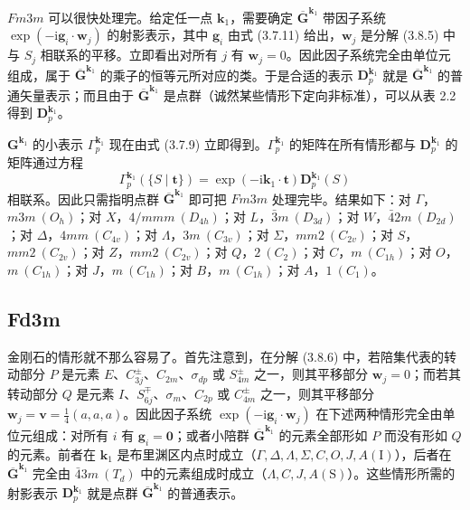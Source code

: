 $Fm3m$ 可以很快处理完。给定任一点 $\mathbf{k}_{1}$，需要确定 $\overline{\mathbf{G}}^{\mathbf{k}_{1}}$ 带因子系统 $\exp(-\mathrm{i}\mathbf{g}_{i} \cdot \mathbf{w}_{j})$ 的射影表示，其中 $\mathbf{g}_{i}$ 由式 (3.7.11) 给出，$\mathbf{w}_{j}$ 是分解 (3.8.5) 中与 $S_{j}$ 相联系的平移。立即看出对所有 $j$ 有 $\mathbf{w}_{j} = 0$。因此因子系统完全由单位元组成，属于 $\overline{\mathbf{G}}^{\mathbf{k}_{1}}$ 的乘子的恒等元所对应的类。于是合适的表示 $\mathbf{D}^{\mathbf{k}_{1}}_{p}$ 就是 $\overline{\mathbf{G}}^{\mathbf{k}_{1}}$ 的普通矢量表示；而且由于 $\overline{\mathbf{G}}^{\mathbf{k}_{1}}$ 是点群（诚然某些情形下定向非标准），可以从表 2.2 得到 $\mathbf{D}^{\mathbf{k}_{1}}_{p}$。

$\mathbf{G}^{\mathbf{k}_{1}}$ 的小表示 $\Gamma^{\mathbf{k}_{1}}_{p}$ 现在由式 (3.7.9) 立即得到。$\Gamma^{\mathbf{k}_{1}}_{p}$ 的矩阵在所有情形都与 $\mathbf{D}^{\mathbf{k}_{1}}_{p}$ 的矩阵通过方程
\begin{equation*}
\Gamma^{\mathbf{k}_{1}}_{p}(\{S \mid \mathbf{t}\}) = \exp(-\mathrm{i}\mathbf{k}_{1} \cdot \mathbf{t})\mathbf{D}^{\mathbf{k}_{1}}_{p}(S)
\tag{3.8.7}
\end{equation*}
相联系。因此只需指明点群 $\overline{\mathbf{G}}^{\mathbf{k}_{1}}$ 即可把 $Fm3m$ 处理完毕。结果如下：对 $\Gamma$，$m3m\ (O_{h})$；对 $X$，$4/mmm\ (D_{4h})$；对 $L$，$\bar{3}m\ (D_{3d})$；对 $W$，$\bar{4}2m\ (D_{2d})$；对 $\Delta$，$4mm\ (C_{4v})$；对 $\Lambda$，$3m\ (C_{3v})$；对 $\Sigma$，$mm2\ (C_{2v})$；对 $S$，$mm2\ (C_{2v})$；对 $Z$，$mm2\ (C_{2v})$；对 $Q$，$2\ (C_{2})$；对 $C$，$m\ (C_{1h})$；对 $O$，$m\ (C_{1h})$；对 $J$，$m\ (C_{1h})$；对 $B$，$m\ (C_{1h})$；对 $A$，$1\ (C_{1})$。

\subsection*{Fd3m}

金刚石的情形就不那么容易了。首先注意到，在分解 (3.8.6) 中，若陪集代表的转动部分 $P$ 是元素 $E$、$C^{\pm}_{3j}$、$C_{2m}$、$\sigma_{dp}$ 或 $S^{\pm}_{4m}$ 之一，则其平移部分 $\mathbf{w}_{j} = 0$；而若其转动部分 $Q$ 是元素 $I$、$S^{\mp}_{6j}$、$\sigma_{m}$、$C_{2p}$ 或 $C^{\pm}_{4m}$ 之一，则其平移部分 $\mathbf{w}_{j} = \mathbf{v} = \frac{1}{4}(a, a, a)$。因此因子系统 $\exp(-\mathrm{i}\mathbf{g}_{i} \cdot \mathbf{w}_{j})$ 在下述两种情形完全由单位元组成：对所有 $i$ 有 $\mathbf{g}_{i} = \mathbf{0}$；或者小陪群 $\overline{\mathbf{G}}^{\mathbf{k}_{1}}$ 的元素全部形如 $P$ 而没有形如 $Q$ 的元素。前者在 $\mathbf{k}_{1}$ 是布里渊区内点时成立（$\Gamma, \Delta, \Lambda, \Sigma, C, O, J, A(\mathrm{I})$），后者在 $\overline{\mathbf{G}}^{\mathbf{k}_{1}}$ 完全由 $\bar{4}3m\ (T_{d})$ 中的元素组成时成立（$\Lambda, C, J, A(\mathrm{S})$）。这些情形所需的射影表示 $\mathbf{D}^{\mathbf{k}_{1}}_{p}$ 就是点群 $\overline{\mathbf{G}}^{\mathbf{k}_{1}}$ 的普通表示。

